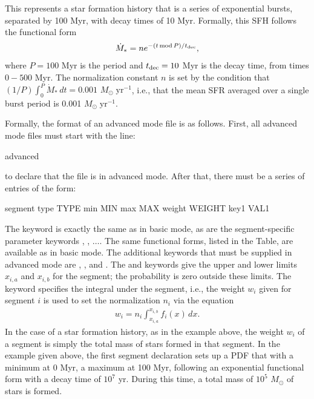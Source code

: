 \documentclass[letterpaper,10pt,english]{sphinxmanual}
\begin{document}
This represents a star formation history that is a series of exponential bursts, separated by 100 Myr, with decay times of 10 Myr. Formally, this SFH follows the functional form
\begin{equation*}
\begin{split}\dot{M}_* = n e^{-(t\,\mathrm{mod}\, P)/t_{\rm dec}},\end{split}
\end{equation*}
where \(P = 100\) Myr is the period and \(t_{\rm dec} = 10\) Myr is the decay time, from times \(0-500\) Myr. The normalization constant \(n\) is set by the condition that \((1/P) \int_0^P \dot{M}_* \,dt = 0.001\) \(M_\odot\;\mathrm{yr}^{-1}\), i.e., that the mean SFR averaged over a single burst period is 0.001 \(M_\odot\;\mathrm{yr}^{-1}\).

Formally, the format of an advanced mode file is as follows. First, all advanced mode files must start with the line:

\begin{sphinxVerbatim}[commandchars=\\\{\}]
advanced
\end{sphinxVerbatim}

to declare that the file is in advanced mode. After that, there must be a series of entries of the form:

\begin{sphinxVerbatim}[commandchars=\\\{\}]
segment
type TYPE
min MIN
max MAX
weight WEIGHT
key1 VAL1
\end{sphinxVerbatim}

The  keyword is exactly the same as in basic mode, as are the segment-specific parameter keywords , , \(\ldots\). The same functional forms, listed in the {\hyperref[\detokenize{pdfs:tab-segtypes}]{}} Table, are available as in basic mode. The additional keywords that must be supplied in advanced mode are , , and . The  and  keywords give the upper and lower limits \(x_{i,a}\) and \(x_{i,b}\) for the segment; the probability is zero outside these limits. The keyword  specifies the integral under the segment, i.e., the weight \(w_i\) given for segment \(i\) is used to set the normalization \(n_i\) via the equation
\begin{equation*}
\begin{split}w_i = n_i \int_{x_{i,a}}^{x_{i,b}} f_i(x) \, dx.\end{split}
\end{equation*}
In the case of a star formation history, as in the example above, the weight \(w_i\) of a segment is simply the total mass of stars formed in that segment. In the example given above, the first segment declaration sets up a PDF that with a minimum at 0 Myr, a maximum at 100 Myr, following an exponential functional form with a decay time of \(10^7\) yr. During this time, a total mass of \(10^5\) \(M_\odot\) of stars is formed.
\end{document}
